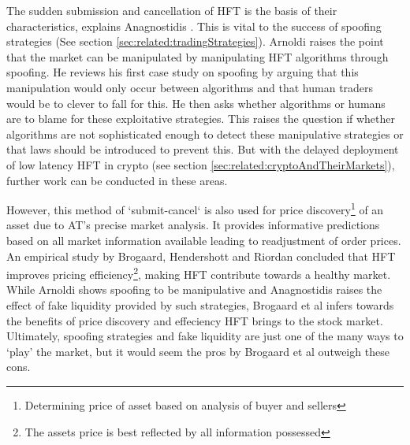 The sudden submission and cancellation of HFT is the basis of their characteristics, explains Anagnostidis \cite{UNPUB:Anagnostidis:2017}. This is vital to the success of spoofing strategies (See section \ref{sec:related:tradingStrategies}). Arnoldi \cite{JOURNAL:Arnoldi:2016} raises the point that the market can be manipulated by manipulating HFT algorithms through spoofing. He reviews his first case study on spoofing by arguing that this manipulation would only occur between algorithms and that human traders would be to clever to fall for this. He then asks whether algorithms or humans are to blame for these exploitative strategies. This raises the question if whether algorithms are not sophisticated enough to detect these manipulative strategies or that laws should be introduced to prevent this. But with the delayed deployment of low latency HFT in crypto (see section \ref{sec:related:cryptoAndTheirMarkets}), further work can be conducted in these areas.

However, this method of `submit-cancel` is also used for price discovery\footnote{Determining price of asset based on analysis of buyer and sellers} of an asset due to AT's precise market analysis. It provides informative predictions based on all market information available leading to readjustment of order prices. An empirical study by Brogaard, Hendershott and Riordan \cite{UNPUB:Brogaard:2017} concluded that HFT improves pricing efficiency\footnote{The assets price is best reflected by all information possessed}, making HFT contribute towards a healthy market. While Arnoldi \cite{JOURNAL:Arnoldi:2016} shows spoofing to be manipulative and Anagnostidis \cite{UNPUB:Anagnostidis:2017} raises the effect of fake liquidity provided by such strategies, Brogaard et al \cite{UNPUB:Brogaard:2017} infers towards the benefits of price discovery and effeciency HFT brings to the stock market. Ultimately, spoofing strategies and fake liquidity are just one of the many ways to `play' the market, but it would seem the pros by Brogaard et al outweigh these cons.

